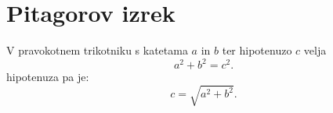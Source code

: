 \documentclass{article}
\begin{document}
\section*{Pitagorov izrek}
V pravokotnem trikotniku s katetama \(a\) in \(b\) ter hipotenuzo \(c\) velja
\[ a^2 + b^2 = c^2.\]
hipotenuza pa je:
\[c = \sqrt{a^2+b^2}. \]
\end{document}
